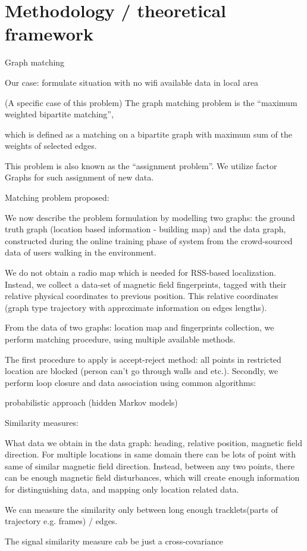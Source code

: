 \section{Methodology / theoretical framework}

Graph matching

Our case: formulate situation with no wifi available data in local area

(A specific case of this problem) The graph matching problem is the “maximum weighted bipartite matching”,

which is defined as a matching on a bipartite graph with maximum sum of the weights of selected edges.

This problem is also known as the “assignment problem”. We utilize factor Graphs for such assignment of new data.

Matching problem proposed:

We now describe the problem formulation by modelling two graphs: the ground truth graph (location based information - building map) and the data graph, constructed during the online training phase of system from the crowd-sourced data of users walking in the environment.

We do not obtain a radio map which is needed for RSS-based localization. Instead, we collect a data-set of magnetic field fingerprints, tagged with their relative physical coordinates to previous position. This relative coordinates (graph type trajectory with approximate information on edges lengths).

From the data of two graphs: location map and fingerprints collection, we perform matching procedure, using multiple available methods.

The first procedure to apply is accept-reject method: all points in restricted location are blocked (person can’t go through walls and etc.). Secondly, we perform loop closure and data association using common algorithms:


probabilistic approach (hidden Markov models)

Similarity measures:

What data we obtain in the data graph: heading, relative position, magnetic field direction. For multiple locations in same domain there can be lots of point with same of similar magnetic field direction. Instead, between any two points, there can be enough magnetic field disturbances, which will create enough information for distinguishing data, and mapping only location related data.

We can measure the similarity only between long enough tracklets(parts of trajectory e.g. frames) / edges.

The signal similarity measure cab be just a cross-covariance


